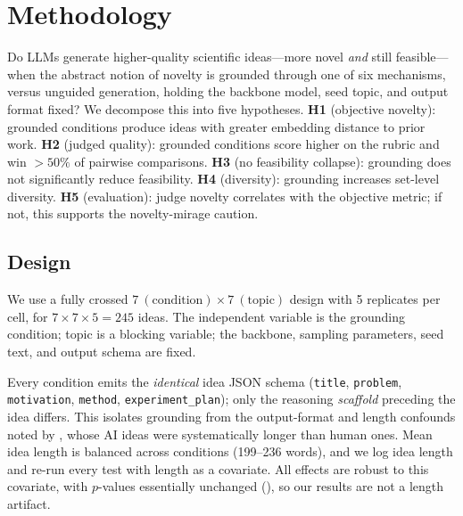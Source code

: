 \section{Methodology}
\label{sec:method}

 Do LLMs generate higher-quality scientific ideas---more novel \emph{and} still feasible---when the abstract notion of novelty is grounded through one of six mechanisms, versus unguided generation, holding the backbone model, seed topic, and output format fixed? We decompose this into five hypotheses. \textbf{H1} (objective novelty): grounded conditions produce ideas with greater embedding distance to prior work. \textbf{H2} (judged quality): grounded conditions score higher on the rubric and win $>50\%$ of pairwise comparisons. \textbf{H3} (no feasibility collapse): grounding does not significantly reduce feasibility. \textbf{H4} (diversity): grounding increases set-level diversity. \textbf{H5} (evaluation): judge novelty correlates with the objective metric; if not, this supports the novelty-mirage caution.

\subsection{Design}

We use a fully crossed $7~(\text{condition}) \times 7~(\text{topic})$ design with 5 replicates per cell, for $7 \times 7 \times 5 = 245$ ideas. The independent variable is the grounding condition; topic is a blocking variable; the backbone, sampling parameters, seed text, and output schema are fixed.

 Every condition emits the \emph{identical} idea JSON schema (\texttt{title}, \texttt{problem}, \texttt{motivation}, \texttt{method}, \texttt{experiment\_plan}); only the reasoning \emph{scaffold} preceding the idea differs. This isolates grounding from the output-format and length confounds noted by \citet{si2024can}, whose AI ideas were systematically longer than human ones. Mean idea length is balanced across conditions (199--236 words), and we log idea length and re-run every test with length as a covariate. All effects are robust to this covariate, with $p$-values essentially unchanged (), so our results are not a length artifact.

